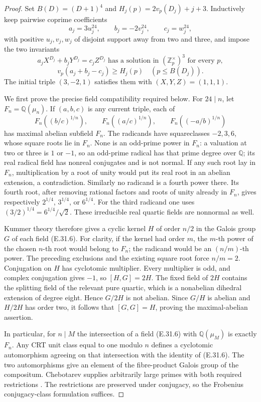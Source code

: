 \begin{proof}
Set $B(D)=(D+1)^4$ and $H_j(p)=2v_p(D_j)+j+3$.  Inductively keep
pairwise coprime coefficients
\[
 a_j=3u_j^{24},\qquad b_j=-2v_j^{24},\qquad c_j=w_j^{24},
\]
with positive $u_j,v_j,w_j$ of disjoint support away from two and three,
and impose the two invariants
\[
 a_jX^{D_j}+b_jY^{D_j}=c_jZ^{D_j}
       \text{ has a solution in }(\mathbb Z_p^\times)^3
       \text{ for every }p,
 \tag{E.31.4}
\]
\[
 v_p(a_j+b_j-c_j)\ge H_j(p)\quad(p\le B(D_j)).
 \tag{E.31.5}
\]
The initial triple $(3,-2,1)$ satisfies them with $(X,Y,Z)=(1,1,1)$.

We first prove the precise field compatibility required below.
For $24\mid n$, let $F_n=\mathbb Q(\mu_n)$.  If $(a,b,c)$ is any
current triple, each of
\[
 F_n((b/c)^{1/n}),\qquad F_n((a/c)^{1/n}),\qquad
 F_n((-a/b)^{1/n})
 \tag{E.31.6}
\]
has maximal abelian subfield $F_n$.  The radicands have squareclasses
$-2,3,6$, whose square roots lie in $F_n$.  None is an odd-prime
power in $F_n$: a valuation at two or three is $1$ or $-1$, so an
odd-prime radical has that prime degree over $\mathbb Q$; its real
radical field has nonreal conjugates and is not normal.  If any such
root lay in $F_n$, multiplication by a root of unity would put its
real root in an abelian extension, a contradiction.  Similarly no
radicand is a fourth power there.  Its fourth root, after removing
rational factors and roots of unity already in $F_n$, gives respectively
$2^{1/4}$, $3^{1/4}$, or $6^{1/4}$.  For the third radicand one uses
$(3/2)^{1/4}=6^{1/4}/\sqrt2$.  These irreducible real quartic fields
are nonnormal as well.

Kummer theory therefore gives a cyclic kernel $H$ of order $n/2$ in
the Galois group $G$ of each field (E.31.6).  For clarity, if the kernel
had order $m$, the $m$-th power of the chosen $n$-th root would belong
to $F_n$; the radicand would be an $(n/m)$-th power.  The preceding
exclusions and the existing square root force $n/m=2$.
Conjugation on $H$ has cyclotomic multiplier.  Every multiplier is odd,
and complex conjugation gives $-1$, so $[H,G]=2H$.  The fixed field of
$2H$ contains the splitting field of the relevant pure quartic, which
is a nonabelian dihedral extension of degree eight.  Hence $G/2H$ is
not abelian.  Since $G/H$ is abelian and $H/2H$ has order two, it follows
that $[G,G]=H$, proving the maximal-abelian assertion.

In particular, for $n\mid M$ the intersection of a field (E.31.6)
with $\mathbb Q(\mu_M)$ is exactly $F_n$.  Any CRT unit class equal
to one modulo $n$ defines a cyclotomic automorphism agreeing on that
intersection with the identity of (E.31.6).  The two automorphisms give
an element of the fibre-product Galois group of the compositum.
Chebotarev supplies arbitrarily large primes with both required
restrictions \cite[Theorem 8.31, p.147]{CohMilneANT}.  The restrictions
are preserved under conjugacy, so the Frobenius conjugacy-class
formulation suffices.


\end{proof}
